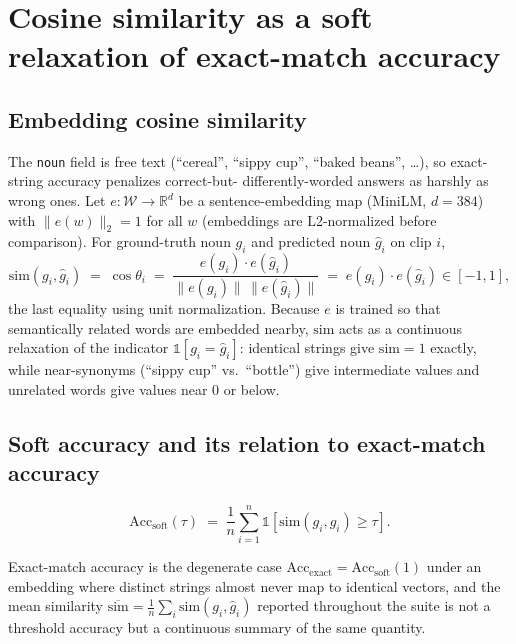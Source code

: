 \section{Cosine similarity as a soft relaxation of exact-match accuracy}
\label{sec:cosine}

\subsection{Embedding cosine similarity}

The \texttt{noun} field is free text (``cereal'', ``sippy cup'',
``baked beans'', \dots), so exact-string accuracy penalizes correct-but-
differently-worded answers as harshly as wrong ones. Let
$e:\mathcal{W}\to\mathbb{R}^d$ be a sentence-embedding map (MiniLM,
$d=384$) with $\lVert e(w)\rVert_2 = 1$ for all $w$ (embeddings are
L2-normalized before comparison). For ground-truth noun $g_i$ and
predicted noun $\hat{g}_i$ on clip $i$,
\[
  \mathrm{sim}(g_i,\hat{g}_i) \;=\; \cos\theta_i \;=\;
  \frac{e(g_i)\cdot e(\hat{g}_i)}{\lVert e(g_i)\rVert\,\lVert e(\hat{g}_i)\rVert}
  \;=\; e(g_i)\cdot e(\hat{g}_i) \in [-1,1],
\]
the last equality using unit normalization. Because $e$ is trained so that
semantically related words are embedded nearby, $\mathrm{sim}$ acts as a
continuous relaxation of the indicator $\mathbb{1}[g_i = \hat{g}_i]$:
identical strings give $\mathrm{sim}=1$ exactly, while near-synonyms
(``sippy cup'' vs.\ ``bottle'') give intermediate values and unrelated
words give values near $0$ or below.

\subsection{Soft accuracy and its relation to exact-match accuracy}

\begin{definition}
\[
  \mathrm{Acc}_{\mathrm{soft}}(\tau) \;=\;
  \frac{1}{n}\sum_{i=1}^n \mathbb{1}\!\left[\mathrm{sim}(g_i,\hat{g}_i) \ge \tau\right].
\]
\end{definition}
Exact-match accuracy is the degenerate case $\mathrm{Acc}_{\mathrm{exact}}
= \mathrm{Acc}_{\mathrm{soft}}(1)$ under an embedding where distinct
strings almost never map to identical vectors, and the mean similarity
$\overline{\mathrm{sim}} = \frac{1}{n}\sum_i \mathrm{sim}(g_i,\hat{g}_i)$
reported throughout the suite is not a threshold accuracy but a
continuous summary of the same quantity.

